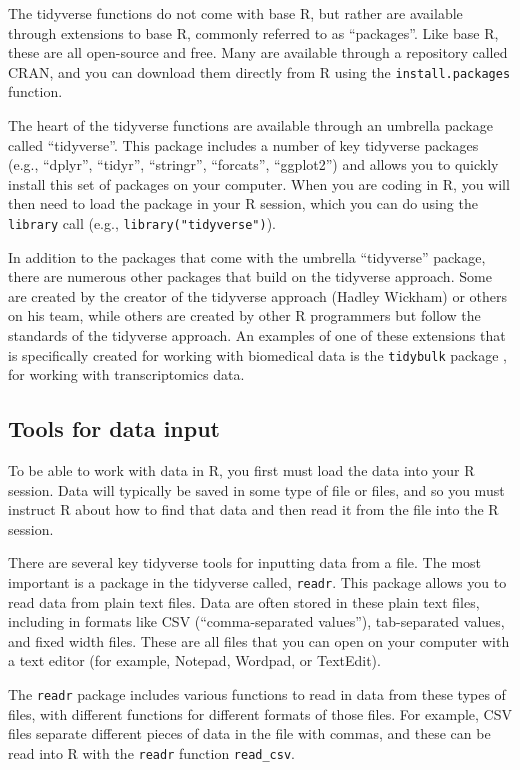 \documentclass[]{tufte-book}
\begin{document}
The tidyverse functions do not come with base R, but rather are available
through extensions to base R, commonly referred to as ``packages''. Like base
R, these are all open-source and free. Many are available through a
repository called CRAN, and you can download them directly from R using the
\texttt{install.packages} function.

The heart of the tidyverse functions are available through an umbrella
package called ``tidyverse''. This package includes a number of key tidyverse
packages (e.g., ``dplyr'', ``tidyr'', ``stringr'', ``forcats'', ``ggplot2'') and allows you
to quickly install this set of packages on your computer. When you are coding
in R, you will then need to load the package in your R session, which you can
do using the \texttt{library} call (e.g., \texttt{library("tidyverse")}).

In addition to the packages that come with the umbrella ``tidyverse'' package,
there are numerous other packages that build on the tidyverse approach.
Some are created by the creator of the tidyverse approach (Hadley Wickham)
or others on his team, while others are created by other R programmers but
follow the standards of the tidyverse approach. An examples of one of
these extensions that is specifically created for working with biomedical data
is the \texttt{tidybulk} package \citep{mangiola2021tidybulk}, for working with
transcriptomics data.

\subsection{Tools for data input}\label{tools-for-data-input}

To be able to work with data in R, you first must load the data into your R
session. Data will typically be saved in some type of file or files, and
so you must instruct R about how to find that data and then read it from
the file into the R session.

There are several key tidyverse tools for inputting data from a file. The
most important is a package in the tidyverse called, \texttt{readr}. This package
allows you to read data from plain text files. Data are often stored in
these plain text files, including in formats like CSV (``comma-separated
values''), tab-separated values, and fixed width files. These are all files
that you can open on your computer with a text editor (for example,
Notepad, Wordpad, or TextEdit).

The \texttt{readr} package includes various functions to read in data from these
types of files, with different functions for different formats of those
files. For example, CSV files separate different pieces of data in the
file with commas, and these can be read into R with the \texttt{readr} function
\texttt{read\_csv}.
\end{document}
